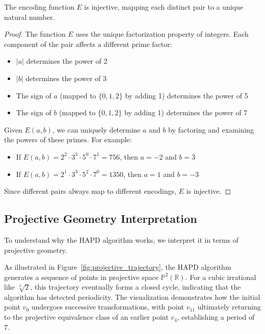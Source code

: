 \begin{lemma}\label{lem:encoding_injective}
The encoding function $E$ is injective, mapping each distinct pair to a unique natural number.
\end{lemma}

\begin{proof}
The function $E$ uses the unique factorization property of integers. Each component of the pair affects a different prime factor:
\begin{itemize}
    \item $|a|$ determines the power of 2
    \item $|b|$ determines the power of 3
    \item The sign of $a$ (mapped to $\{0,1,2\}$ by adding 1) determines the power of 5
    \item The sign of $b$ (mapped to $\{0,1,2\}$ by adding 1) determines the power of 7
\end{itemize}

Given $E(a,b)$, we can uniquely determine $a$ and $b$ by factoring and examining the powers of these primes. For example:
\begin{itemize}
    \item If $E(a,b) = 2^2 \cdot 3^3 \cdot 5^0 \cdot 7^1 = 756$, then $a = -2$ and $b = 3$
    \item If $E(a,b) = 2^1 \cdot 3^3 \cdot 5^2 \cdot 7^0 = 1350$, then $a = 1$ and $b = -3$
\end{itemize}

Since different pairs always map to different encodings, $E$ is injective.
\end{proof}

\subsection{Projective Geometry Interpretation}

To understand why the HAPD algorithm works, we interpret it in terms of projective geometry.

As illustrated in Figure~\ref{fig:projective_trajectory}, the HAPD algorithm generates a sequence of points in projective space $\mathbb{P}^2(\mathbb{R})$. For a cubic irrational like $\sqrt[3]{2}$, this trajectory eventually forms a closed cycle, indicating that the algorithm has detected periodicity. The visualization demonstrates how the initial point $v_0$ undergoes successive transformations, with point $v_{11}$ ultimately returning to the projective equivalence class of an earlier point $v_4$, establishing a period of 7.

